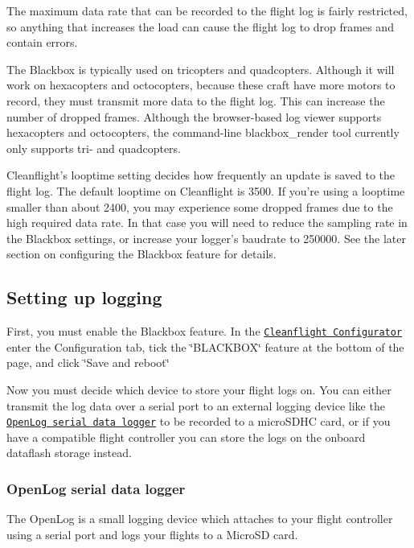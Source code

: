 The maximum data rate that can be recorded to the flight log is fairly restricted, so anything that increases the load can cause the flight log to drop frames and contain errors.

The Blackbox is typically used on tricopters and quadcopters. Although it will work on hexacopters and octocopters, because these craft have more motors to record, they must transmit more data to the flight log. This can increase the number of dropped frames. Although the browser-\/based log viewer supports hexacopters and octocopters, the command-\/line {\ttfamily blackbox\+\_\+render} tool currently only supports tri-\/ and quadcopters.

Cleanflight's {\ttfamily looptime} setting decides how frequently an update is saved to the flight log. The default looptime on Cleanflight is 3500. If you're using a looptime smaller than about 2400, you may experience some dropped frames due to the high required data rate. In that case you will need to reduce the sampling rate in the Blackbox settings, or increase your logger's baudrate to 250000. See the later section on configuring the Blackbox feature for details.

\subsection*{Setting up logging}

First, you must enable the Blackbox feature. In the \href{https://chrome.google.com/webstore/detail/cleanflight-configurator/enacoimjcgeinfnnnpajinjgmkahmfgb?hl=en}{\tt Cleanflight Configurator} enter the Configuration tab, tick the \char`\"{}\+B\+L\+A\+C\+K\+B\+O\+X\char`\"{} feature at the bottom of the page, and click \char`\"{}\+Save and reboot\char`\"{}

Now you must decide which device to store your flight logs on. You can either transmit the log data over a serial port to an external logging device like the \href{https://www.sparkfun.com/products/9530}{\tt Open\+Log serial data logger} to be recorded to a micro\+S\+D\+H\+C card, or if you have a compatible flight controller you can store the logs on the onboard dataflash storage instead.

\subsubsection*{Open\+Log serial data logger}

The Open\+Log is a small logging device which attaches to your flight controller using a serial port and logs your flights to a Micro\+S\+D card.

